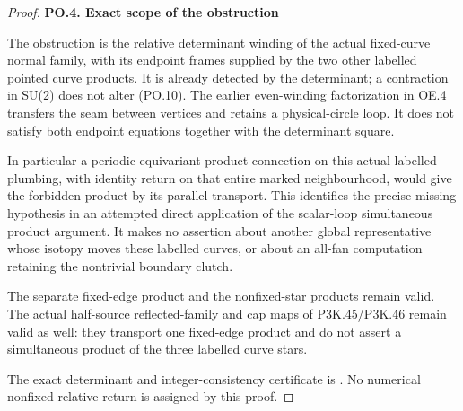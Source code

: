 \begin{proof}
\par

\medskip\noindent\textbf{PO.4. Exact scope of the obstruction}

\par\nobreak

The obstruction is the relative determinant winding of the actual
fixed-curve normal family, with its endpoint frames supplied by the
two other labelled pointed curve products. It is already detected
by the determinant; a contraction in SU(2) does not alter (PO.10).
The earlier even-winding factorization in OE.4 transfers the seam
between vertices and retains a physical-circle loop. It does not
satisfy both endpoint equations together with the determinant square.

In particular a periodic equivariant product connection on this
actual labelled plumbing, with identity return on that entire
marked neighbourhood, would give the forbidden product by its
parallel transport. This identifies the precise missing hypothesis
in an attempted direct application of the scalar-loop simultaneous
product argument. It makes no assertion about another global
representative whose isotopy moves these labelled curves, or about
an all-fan computation retaining the nontrivial boundary clutch.

The separate fixed-edge product and the nonfixed-star products
remain valid. The actual half-source reflected-family and cap maps
of P3K.45/P3K.46 remain valid as well: they transport one fixed-edge
product and do not assert a simultaneous product of the three
labelled curve stars.

The exact determinant and integer-consistency certificate is
. No numerical
nonfixed relative return is assigned by this proof.
\end{proof}
